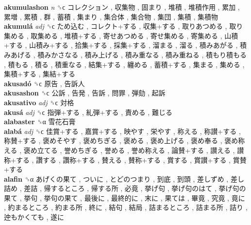 \textbf{akumulashon} \emph{n}  ␝ϲ   コレクション ,  収集物 ,  固まり ,  堆積 ,  堆積作用 ,  累加 ,  累増 ,  累積 ,  群 ,  蓄積 ,  集まり ,  集合体 ,  集合物 ,  集団 ,  集積 ,  集積物   \\
\textbf{akumulá} \emph{adj}  ␝ϲ   ため込む ,  コレクト+する ,  収集+する ,  取りあつめる ,  取り集める ,  取集める ,  堆積+する ,  寄せあつめる ,  寄せ集める ,  寄集める ,  山積+する ,  山積み+する ,  拾集+する ,  採集+する ,  溜まる ,  溜る ,  積みあがる ,  積みあげる ,  積みかさなる ,  積み上げる ,  積み重なる ,  積み重ねる ,  積もり積もる ,  積もる ,  積る ,  積重なる ,  結集+する ,  纏める ,  蓄積+する ,  集まる ,  集める ,  集積+する ,  集結+する   \\
\textbf{akusadó} ␝ϲ   原告 ,  告訴人   \\
\textbf{akusashon} ␝ϲ   公訴 ,  告発 ,  告訴 ,  問罪 ,  弾劾 ,  起訴   \\
\textbf{akusativo} \emph{adj}  ␝ϲ   対格   \\
\textbf{akusá} \emph{adj}  ␝ϲ   指弾+する ,  糺弾+する ,  責める ,  難じる   \\
\textbf{alabaster} ␝α   雪花石膏   \\
\textbf{alabá} \emph{adj}  ␝ϲ   佳賞+する ,  嘉賞+する ,  映やす ,  栄やす ,  称える ,  称讃+する ,  称賛+する ,  褒めそやす ,  褒めちぎる ,  褒める ,  褒め上げる ,  褒め奉る ,  褒め称える ,  褒め立てる ,  誉めちぎる ,  誉める ,  誉め称える ,  論賛+する ,  讃える ,  讃称+する ,  讚する ,  讚称+する ,  賛える ,  賛称+する ,  賞する ,  賞讃+する ,  賞賛+する   \\
\textbf{alafin} ␝α   あげくの果て ,  ついに ,  とどのつまり ,  到底 ,  到頭 ,  差しずめ ,  差し詰め ,  差詰 ,  帰するところ ,  帰する所 ,  必竟 ,  挙げ句 ,  挙げ句のはて ,  挙げ句の果て ,  挙句 ,  挙句の果て ,  最後に ,  最終的に ,  末に ,  果ては ,  畢竟 ,  究竟 ,  竟に ,  約まるところ ,  約まる所 ,  終に ,  結句 ,  結局 ,  詰まるところ ,  詰まる所 ,  詰り ,  迚もかくても ,  遂に   \\
